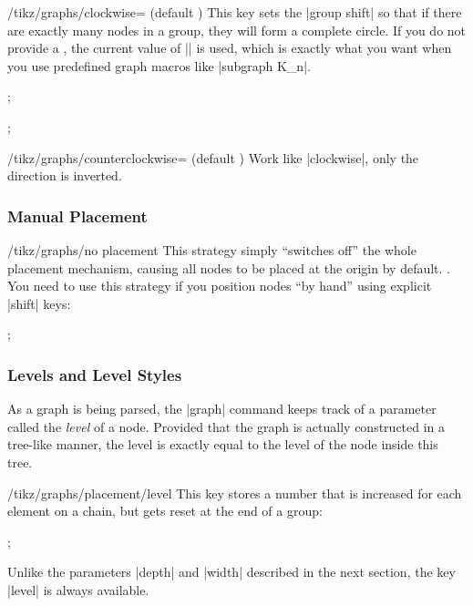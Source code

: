 \begin{key}{/tikz/graphs/clockwise= (default \string\tikzgraphVnum)}
  This key sets the |group shift| so that if there are exactly
   many nodes in a group, they will form a complete
  circle. If you do not provide a , the current value of
  |\tikzgraphVnum| is used, which is exactly what you want when you
  use predefined graph macros like |subgraph K_n|.
\begin{codeexample}[]
\tikz {};
\end{codeexample}
\begin{codeexample}[]
\tikz {};
\end{codeexample}
\end{key}

\begin{key}{/tikz/graphs/counterclockwise= (default \string\tikzgraphVnum)}
  Work like |clockwise|, only the direction is inverted.
\end{key}

\subsubsection{Manual Placement}

\begin{key}{/tikz/graphs/no placement}
  This strategy simply ``switches off'' the whole placement
  mechanism, causing all nodes to be placed at the origin by
  default. . You need to use this strategy if you position nodes ``by
  hand'' using explicit |shift| keys:
\begin{codeexample}[]
\tikz {};
\end{codeexample}
\end{key}




\subsubsection{Levels and Level Styles}

As a graph is being parsed, the |graph| command keeps track of a
parameter called the \emph{level} of a node. Provided that the graph
is actually constructed in a tree-like manner, the level is exactly
equal to the level of the node inside this tree.

\begin{key}{/tikz/graphs/placement/level}
  This key stores a number that is increased for each element on a
  chain, but gets reset at the end of a group:
\begin{codeexample}[]
\tikz {};
\end{codeexample}
  Unlike the parameters |depth| and |width| described in the next
  section, the key |level| is always available.
\end{key}

